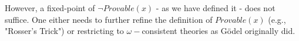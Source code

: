 However, a fixed-point of $\neg Provable(x)$ - as we have defined it - does not suffice. One either needs to further refine the definition of $Provable(x)$ (e.g., "Rosser’s Trick") or restricting to $\omega-$consistent theories as Gödel originally did.
